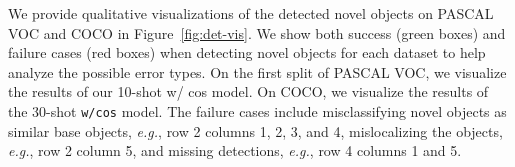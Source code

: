 \begin{table}[!h]
	\centering
	\footnotesize
	\setlength{\tabcolsep}{0.4em}
	\caption{Ablation of scaling factor of cosine similarity. \vspace{1mm}}
	\label{tab:cos_scale}
\end{table}

We provide qualitative visualizations of the detected novel objects on PASCAL VOC and COCO in Figure~\ref{fig:det-vis}.
We show both success (green boxes) and failure cases (red boxes) when detecting novel objects for each dataset to help analyze the possible error types.
On the first split of PASCAL VOC, we visualize the results of our 10-shot \model w/ cos model.
On COCO, we visualize the results of the 30-shot \texttt{\model w/cos} model.
The failure cases include misclassifying novel objects as similar base objects, \textit{e.g.}, row 2 columns 1, 2, 3, and 4, mislocalizing the objects, \textit{e.g.}, row 2 column 5, and missing detections, \textit{e.g.}, row 4 columns 1 and 5.


